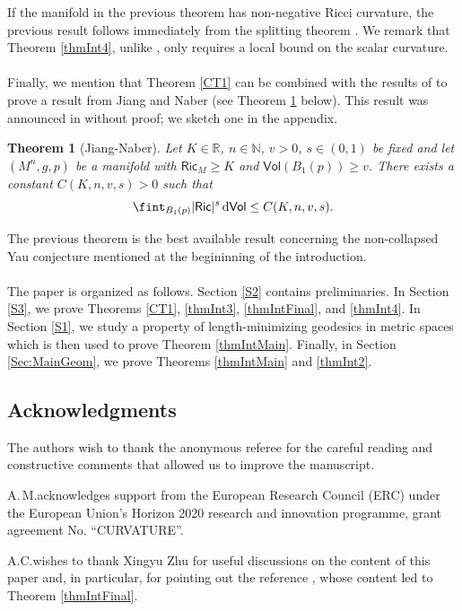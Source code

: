 \documentclass[10pt]{article}
\newtheorem{thm}{Theorem}[section]
\theoremstyle{definition}
\newcommand{\bb}[1]{\mathbb{#1}}
\newcommand{\ssf}[1]{\mathsf{#1}}
\newcommand{\Ric}{\mathsf{Ric}}
\newcommand{\de}{{\rm d}}
\begin{document}
    If the manifold in the previous theorem has non-negative Ricci curvature, the previous result follows immediately from the splitting theorem \cite{SplittingCheegerGromoll}. We remark that Theorem \ref{thmInt4}, unlike \cite[Theorem 1.7]{zhu2024twodimensionvanishingsplittingpositive}, only requires a local bound on the scalar curvature.
\\
\\
Finally, we mention that Theorem \ref{CT1} can be combined with the results of \cite{CheegerNaber} to prove a result from Jiang and Naber (see Theorem \ref{TJN} below). This result was announced in \cite{Naberconjectures} without proof; we  sketch one in the appendix.

\begin{thm}[Jiang-Naber] \label{TJN}
    Let $K \in \bb{R}$, $n \in \bb{N}$, $v>0$, $s \in (0,1)$ be fixed and let $(M^n,g,p)$ be a manifold with $\Ric_M \geq K$ and $\ssf{Vol}(B_1(p)) \geq v$. There exists a constant $C(K,n,v,s)>0$ such that
    \[
    \fint_{B_1(p)} |\Ric|^s \,\de\ssf{Vol} \leq  C(K,n,v,s).
    \]
\end{thm}

The previous theorem is the best available result concerning the non-collapsed Yau conjecture mentioned at the begininning of the introduction. 
\\
\\
The paper is organized as follows.
Section \ref{S2} contains preliminaries. In Section \ref{S3}, we prove Theorems \ref{CT1}, \ref{thmInt3}, \ref{thmIntFinal}, and \ref{thmInt4}. In Section \ref{S1}, we study a property of length-minimizing geodesics in metric spaces which is then used to prove Theorem \ref{thmIntMain}. Finally, in Section \ref{Sec:MainGeom}, we prove Theorems \ref{thmIntMain} and \ref{thmInt2}. 

\subsection*{ Acknowledgments}  
The authors wish to thank the anonymous referee for the careful reading and constructive comments that allowed us to improve the manuscript.

A.\,M.\;acknowledges support from the European Research Council (ERC) under the European Union's Horizon 2020 research and innovation programme, grant agreement No. ``CURVATURE''.  


A.\;C.\;wishes to thank Xingyu Zhu for useful discussions on the content of this paper and, in particular, for pointing out the reference \cite{zhu2024twodimensionvanishingsplittingpositive}, whose content led to Theorem \ref{thmIntFinal}.
\end{document}
